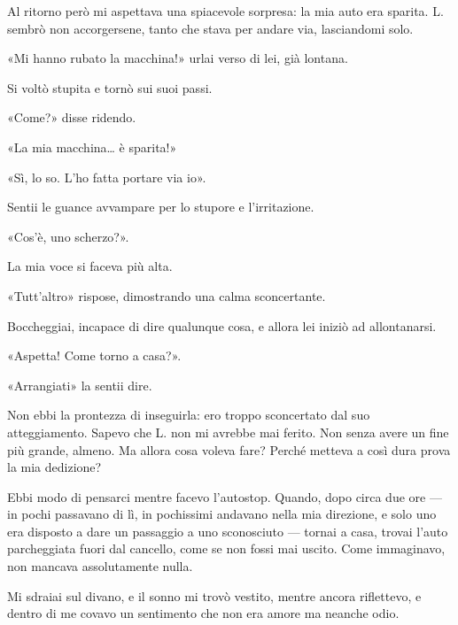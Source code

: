 Al ritorno però mi aspettava una spiacevole sorpresa: la mia auto era sparita. L. sembrò non
accorgersene, tanto che stava per andare via, lasciandomi solo.

«Mi hanno rubato la macchina!» urlai verso di lei, già lontana.

Si voltò stupita e tornò sui suoi passi.

«Come?» disse ridendo.

«La mia macchina\dots{} è sparita!»

«Sì, lo so. L'ho fatta portare via io».

Sentii le guance avvampare per lo stupore e l'irritazione.

«Cos'è, uno scherzo?».

La mia voce si faceva più alta.

«Tutt'altro» rispose, dimostrando una calma sconcertante.

Boccheggiai, incapace di dire qualunque cosa, e allora lei iniziò ad allontanarsi.

«Aspetta! Come torno a casa?».

«Arrangiati» la sentii dire.

Non ebbi la prontezza di inseguirla: ero troppo sconcertato dal suo atteggiamento. Sapevo che L. non
mi avrebbe mai ferito. Non senza avere un fine più grande, almeno. Ma allora cosa voleva fare?
Perché metteva a così dura prova la mia dedizione?

Ebbi modo di pensarci mentre facevo l'autostop. Quando, dopo circa due ore --- in pochi passavano di
lì, in pochissimi andavano nella mia direzione, e solo uno era disposto a dare un passaggio a uno
sconosciuto --- tornai a casa, trovai l'auto parcheggiata fuori dal cancello, come se non fossi mai
uscito. Come immaginavo, non mancava assolutamente nulla.

Mi sdraiai sul divano, e il sonno mi trovò vestito, mentre ancora riflettevo, e dentro di me covavo
un sentimento che non era amore ma neanche odio.
